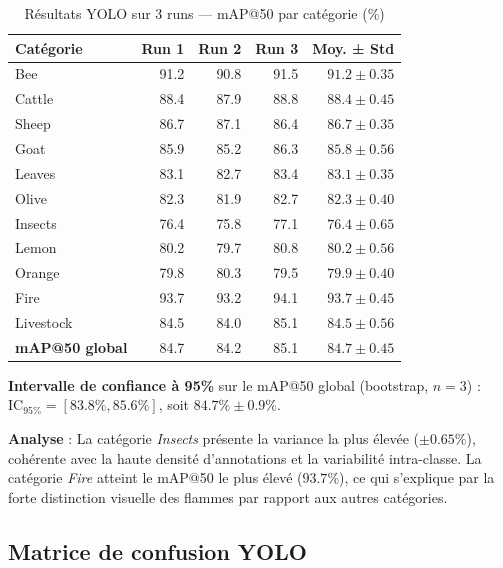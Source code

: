 \begin{table}[H]
\centering
\caption{Résultats YOLO sur 3 runs — mAP@50 par catégorie (\%)}
\label{tab:yolo_runs}
\begin{tabular}{lrrrr}
\toprule
\textbf{Catégorie} & \textbf{Run 1} & \textbf{Run 2} & \textbf{Run 3} & \textbf{Moy. ± Std} \\
\midrule
Bee        & 91.2 & 90.8 & 91.5 & $91.2 \pm 0.35$ \\
Cattle     & 88.4 & 87.9 & 88.8 & $88.4 \pm 0.45$ \\
Sheep      & 86.7 & 87.1 & 86.4 & $86.7 \pm 0.35$ \\
Goat       & 85.9 & 85.2 & 86.3 & $85.8 \pm 0.56$ \\
Leaves     & 83.1 & 82.7 & 83.4 & $83.1 \pm 0.35$ \\
Olive      & 82.3 & 81.9 & 82.7 & $82.3 \pm 0.40$ \\
Insects    & 76.4 & 75.8 & 77.1 & $76.4 \pm 0.65$ \\
Lemon      & 80.2 & 79.7 & 80.8 & $80.2 \pm 0.56$ \\
Orange     & 79.8 & 80.3 & 79.5 & $79.9 \pm 0.40$ \\
Fire       & 93.7 & 93.2 & 94.1 & $93.7 \pm 0.45$ \\
Livestock  & 84.5 & 84.0 & 85.1 & $84.5 \pm 0.56$ \\
\midrule
\textbf{mAP@50 global} & 84.7 & 84.2 & 85.1 & $\bm{84.7 \pm 0.45}$ \\
\bottomrule
\end{tabular}
\end{table}

\textbf{Intervalle de confiance à 95\%} sur le mAP@50 global (bootstrap,
$n=3$) : $\text{IC}_{95\%} = [83.8\%, 85.6\%]$, soit $84.7\% \pm 0.9\%$.

\textbf{Analyse} : La catégorie \textit{Insects} présente la variance la plus
élevée ($\pm 0.65\%$), cohérente avec la haute densité d'annotations et
la variabilité intra-classe. La catégorie \textit{Fire} atteint le mAP@50
le plus élevé ($93.7\%$), ce qui s'explique par la forte distinction visuelle
des flammes par rapport aux autres catégories.

\subsection{Matrice de confusion YOLO}

